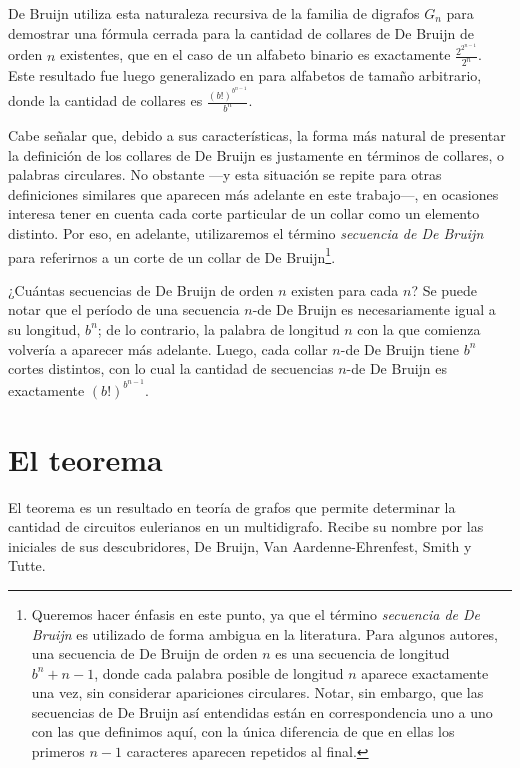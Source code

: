 De Bruijn utiliza esta naturaleza recursiva de la familia de digrafos $G_n$
para demostrar una fórmula cerrada para la cantidad de collares de De Bruijn
de orden $n$ existentes, que en el caso de un alfabeto binario es exactamente
$\frac{2^{2^{n-1}}}{2^n}$. Este resultado fue luego generalizado en
\cite{van-aardenne-ehrenfest-circuits-and-trees} para alfabetos de tamaño arbitrario,
donde la cantidad de collares es $\frac{(b!)^{b^{n-1}}}{b^n}$.

Cabe señalar que, debido a sus características, la forma más natural de
presentar la definición de los collares de De Bruijn es justamente en términos
de collares, o palabras circulares. No obstante ---y esta situación se repite
para otras definiciones similares que aparecen más adelante en este trabajo---,
en ocasiones interesa tener en cuenta cada corte particular de un collar como
un elemento distinto. Por eso, en adelante, utilizaremos el término
\emph{secuencia de De Bruijn} para referirnos a un corte de un collar de De
Bruijn\footnote{Queremos hacer énfasis en este punto, ya que el término
\emph{secuencia de De Bruijn} es utilizado de forma ambigua en la literatura.
Para algunos autores, una secuencia de De Bruijn de orden $n$ es una secuencia
de longitud $b^n + n - 1$, donde cada palabra posible de longitud $n$ aparece
exactamente una vez, sin considerar apariciones circulares. Notar, sin embargo,
que las secuencias de De Bruijn así entendidas están en correspondencia uno a
uno con las que definimos aquí, con la única diferencia de que en ellas los
primeros $n-1$ caracteres aparecen repetidos al final.}.

¿Cuántas secuencias de De Bruijn de orden $n$ existen para cada $n$? Se puede notar que
el período de una secuencia $n$-de De Bruijn es necesariamente igual a su
longitud, $b^n$; de lo contrario, la palabra de longitud $n$ con la que comienza
volvería a aparecer más adelante. Luego, cada collar $n$-de De Bruijn tiene
$b^n$ cortes distintos, con lo cual la cantidad de secuencias $n$-de De Bruijn
es exactamente $(b!)^{b^{n-1}}$.

\section{El teorema \BEST{}}

El teorema \BEST{} es un resultado en teoría de grafos que permite determinar la
cantidad de circuitos eulerianos en un multidigrafo. Recibe su nombre por las
iniciales de sus descubridores, De Bruijn, Van Aardenne-Ehrenfest, Smith y
Tutte.

